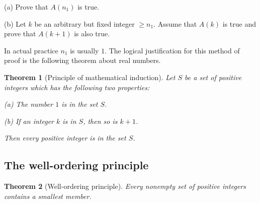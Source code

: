 \documentclass{article}
\newtheorem{theorem}{Theorem}[section]
\begin{document}
(a) Prove that \(A(n_{1})\) is true.

(b) Let \(k\) be an arbitrary but fixed integer \(\geq n_{1}\). Assume that \(A(k)\) is true and prove that \(A(k + 1)\) is also true.

In actual practice \(n_{1}\) is usually \(1\). The logical justification for this method of proof is the following theorem about real numbers.

\begin{theorem}[Principle of mathematical induction]
    Let \(S\) be a set of positive integers which has the following two properties:

    (a) The number \(1\) is in the set \(S\).

    (b) If an integer \(k\) is in \(S\), then so is \(k + 1\).

    Then every positive integer is in the set \(S\).
\end{theorem}

\subsection{The well-ordering principle}

\begin{theorem}[Well-ordering principle]
    Every nonempty set of positive integers contains a smallest member.
\end{theorem}
\end{document}
